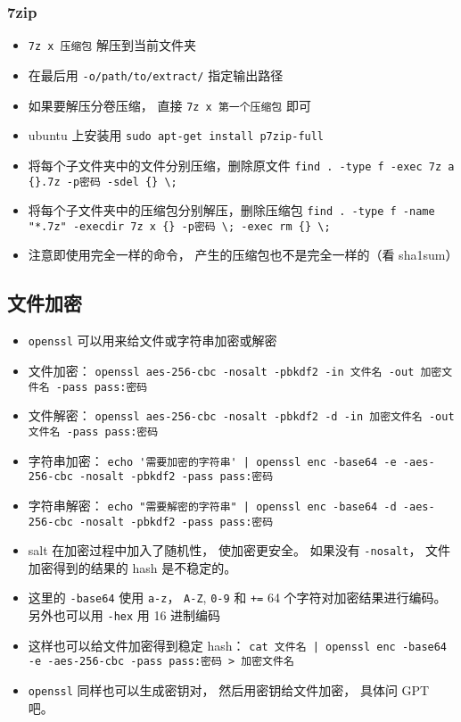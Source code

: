 \subsubsection{7zip}
\begin{itemize}
\item \verb|7z x 压缩包| 解压到当前文件夹
\item 在最后用 \verb`-o/path/to/extract/` 指定输出路径
\item 如果要解压分卷压缩， 直接 \verb`7z x 第一个压缩包` 即可
\item ubuntu 上安装用 \verb`sudo apt-get install p7zip-full`

\item 将每个子文件夹中的文件分别压缩，删除原文件
\verb`find . -type f -exec 7z a {}.7z -p密码 -sdel {} \;`
\item 将每个子文件夹中的压缩包分别解压，删除压缩包
\verb`find . -type f -name "*.7z" -execdir 7z x {} -p密码 \; -exec rm {} \;`
\item 注意即使用完全一样的命令， 产生的压缩包也不是完全一样的（看 sha1sum）
\end{itemize}

\subsection{文件加密}
\begin{itemize}
\item \verb|openssl| 可以用来给文件或字符串加密或解密
\item 文件加密： \verb`openssl aes-256-cbc -nosalt -pbkdf2 -in 文件名 -out 加密文件名 -pass pass:密码`
\item 文件解密： \verb`openssl aes-256-cbc -nosalt -pbkdf2 -d -in 加密文件名 -out 文件名 -pass pass:密码`
\item 字符串加密： \verb`echo '需要加密的字符串' | openssl enc -base64 -e -aes-256-cbc -nosalt -pbkdf2 -pass pass:密码`
\item 字符串解密： \verb`echo "需要解密的字符串" | openssl enc -base64 -d -aes-256-cbc -nosalt -pbkdf2 -pass pass:密码`
\item salt 在加密过程中加入了随机性， 使加密更安全。 如果没有 \verb|-nosalt|， 文件加密得到的结果的 hash 是不稳定的。
\item 这里的 \verb|-base64| 使用 \verb|a-z|， \verb|A-Z|, \verb|0-9| 和 \verb|+=| 64 个字符对加密结果进行编码。 另外也可以用 \verb|-hex| 用 16 进制编码
\item 这样也可以给文件加密得到稳定 hash： \verb`cat 文件名 | openssl enc -base64 -e -aes-256-cbc -pass pass:密码 > 加密文件名`
\item \verb|openssl| 同样也可以生成密钥对， 然后用密钥给文件加密， 具体问 GPT 吧。
\end{itemize}

